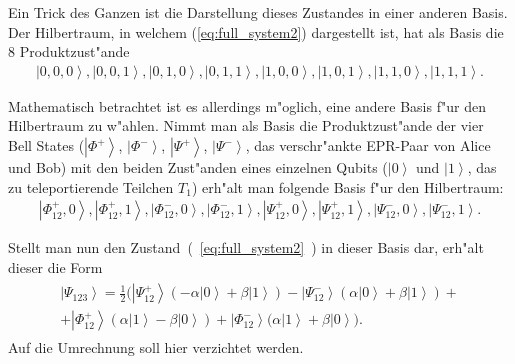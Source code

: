 \begin{refsection}
Ein Trick des Ganzen ist die Darstellung dieses Zustandes in einer anderen Basis. Der Hilbertraum, in welchem (\ref{eq:full_system2}) dargestellt ist, hat als Basis die 8 Produktzust"ande
\begin{align}
\left|  0,0,0 \right \rangle,\left|  0,0,1 \right \rangle,\left|  0,1,0 \right \rangle,\left|  0,1,1 \right \rangle,\left|  1,0,0 \right \rangle,\left|  1,0,1 \right \rangle,\left|  1,1,0 \right \rangle,\left|  1,1,1 \right \rangle.
\end{align}

Mathematisch betrachtet ist es allerdings m"oglich, eine andere Basis f"ur den Hilbertraum zu w"ahlen. Nimmt man als Basis die Produktzust"ande der vier Bell States ($\left|\Phi^+\right\rangle$, $\left|\Phi^-\right\rangle$, $\left|\Psi^+\right\rangle$, $\left|\Psi^-\right\rangle$, das verschr"ankte EPR-Paar von Alice und Bob) mit den beiden Zust"anden eines einzelnen Qubits ($\left|0\right\rangle$ und $\left|1\right\rangle$, das zu teleportierende Teilchen $T_{1}$) erh"alt man folgende Basis f"ur den Hilbertraum:
\begin{align}
\left|\Phi^{+}_{12},0\right\rangle,
\left|\Phi^{+}_{12},1\right\rangle, 
\left|\Phi^{-}_{12},0\right\rangle,
\left|\Phi^{-}_{12},1\right\rangle,
\left|\Psi^{+}_{12},0\right\rangle,
\left|\Psi^{+}_{12},1\right\rangle,
\left|\Psi^{-}_{12},0\right\rangle,
\left|\Psi^{-}_{12},1\right\rangle.
\end{align}

Stellt man nun den Zustand~(~\ref{eq:full_system2}~) in dieser Basis dar, erh"alt dieser die Form
\begin{align}\label{eq:full_system3}
	\begin{split}
\left| \Psi_{123} \right\rangle = \frac{1}{2} \Bigg( \left| \Psi_{12}^{+} \right\rangle (-\alpha \left| 0 \right\rangle + \beta \left| 1 \right\rangle) - \left| \Psi_{12}^{-} \right\rangle (\alpha \left| 0 \right\rangle + \beta \left| 1 \right\rangle ) +
\\
+ \left| \Phi_{12}^{+} \right\rangle (\alpha \left| 1 \right\rangle - \beta \left| 0 \right\rangle) + \left| \Phi_{12}^{-} \right\rangle (\alpha \left| 1 \right\rangle + \beta \left| 0 \right\rangle
 \Bigg).
 \end{split}
\end{align}
Auf die Umrechnung soll hier verzichtet werden.


\end{refsection}

